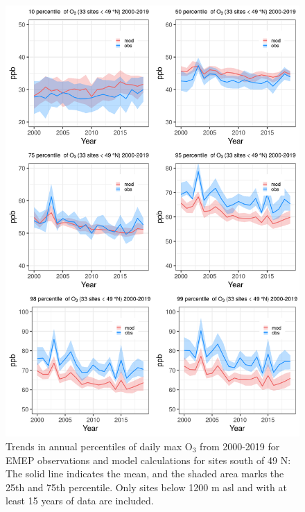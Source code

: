 \begin{figure}[h]
	\centering
	\includegraphics[width=0.74\paperwidth]{FIGS_TRENDS/alltrends_south_49_2000_2019_1200m.png}
	\caption{\label{fig:O3_perctrends_S}Trends in annual percentiles of daily max O$_3$ from 2000-2019 for EMEP observations and model calculations for sites south of 49 \degrees N: The solid line indicates the mean, and the shaded area marks the 25th and 75th percentile. Only sites below 1200 m asl and with at least 15 years of data are included.}
\end{figure}

